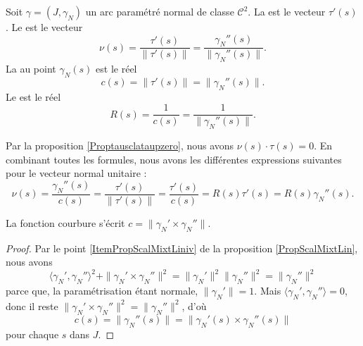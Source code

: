 \begin{definition}      \label{DefCourbureNormleUnit}
    Soit $\gamma=(J,\gamma_N)$ un arc paramétré normal de classe $\mathcal{C}^2$. La  est le vecteur $\tau'(s)$. Le  est le vecteur
    \begin{equation}
        \nu(s)=\frac{ \tau'(s) }{ \| \tau'(s) \| }=\frac{ \gamma_N''(s) }{ \| \gamma_N''(s) \| }.
    \end{equation}
    La  au point $\gamma_N(s)$ est le réel
    \begin{equation}
        c(s)=\| \tau'(s) \|=\| \gamma_N''(s) \|.
    \end{equation}
    Le  est le réel
    \begin{equation}
        R(s)=\frac{1}{ c(s) }=\frac{1}{ \| \gamma_N''(s) \| }.
    \end{equation}
\end{definition}

Par la proposition \ref{Proptausclataupzero}, nous avons $\nu(s)\cdot\tau(s)=0$. En combinant toutes les formules, nous avons les différentes expressions suivantes pour le vecteur normal unitaire :
\begin{equation}        \label{Eq0908nufractauRc}
    \nu(s)=\frac{ \gamma_N''(s) }{ c(s) }=\frac{ \tau'(s) }{ \| \tau'(s) \| }=\frac{ \tau'(s) }{ c(s) }=R(s)\tau'(s)=R(s)\gamma_N''(s).
\end{equation}

\begin{proposition}
    La fonction courbure s'écrit $c=\| \gamma_N'\times \gamma_N'' \|$.
\end{proposition}

\begin{proof}
    Par le point \ref{ItemPropScalMixtLiniv} de la proposition \ref{PropScalMixtLin}, nous avons
    \begin{equation}
        \langle \gamma_N', \gamma_N''\rangle^2 + \| \gamma_N'\times \gamma_N'' \|^2=\| \gamma_N' \|^2\| \gamma_N'' \|^2=\| \gamma_N'' \|^2
    \end{equation}
    parce que, la paramétrisation étant normale, $\| \gamma_N' \|=1$. Mais $\langle \gamma_N', \gamma_N''\rangle =0$, donc il reste $\| \gamma_N'\times \gamma_N'' \|^2=\| \gamma_N'' \|^2$, d'où
    \begin{equation}        \label{Eqcsnormgpgpps}
        c(s)=\| \gamma_N''(s) \|=\| \gamma_N'(s)\times \gamma_N''(s) \|
    \end{equation}
    pour chaque $s$ dans $J$.
\end{proof}

